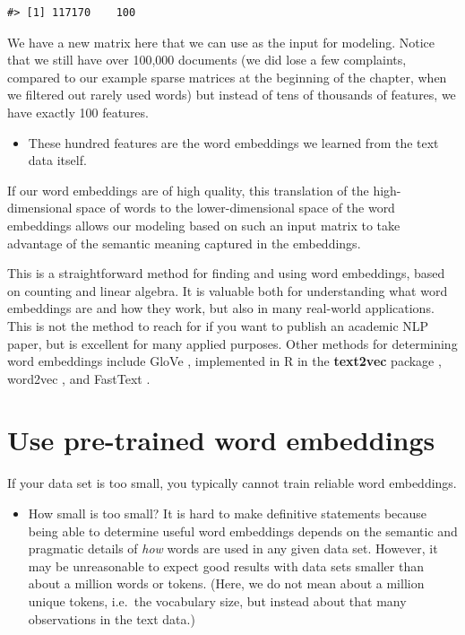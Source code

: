 \documentclass[
]{krantz}
\newenvironment{rmdblock}[1]
  {\begin{shaded*}
  \begin{itemize}[left = -1cm, labelsep = 1cm]
  \renewcommand{\labelitemi}{
    \raisebox{-.7\height}[0pt][0pt]{
      {\setkeys{Gin}{width=3em,keepaspectratio}\texttt{[image: images/\#1]}}
    }
  }
 
  \item
  }
  {
  \end{itemize}
  \end{shaded*}
  }
\newenvironment{rmdnote}
  {\begin{rmdblock}{note}}
  {\end{rmdblock}}
\newenvironment{rmdwarning}
  {\begin{rmdblock}{warning}}
  {\end{rmdblock}}
\begin{document}
\begin{verbatim}
#> [1] 117170    100
\end{verbatim}

We have a new matrix here that we can use as the input for modeling. Notice that we still have over 100,000 documents (we did lose a few complaints, compared to our example sparse matrices at the beginning of the chapter, when we filtered out rarely used words) but instead of tens of thousands of features, we have exactly 100 features.

\begin{rmdnote}
These hundred features are the word embeddings we learned from the text
data itself.
\end{rmdnote}

If our word embeddings are of high quality, this translation of the high-dimensional space of words to the lower-dimensional space of the word embeddings allows our modeling based on such an input matrix to take advantage of the semantic meaning captured in the embeddings.

This is a straightforward method for finding and using word embeddings, based on counting and linear algebra. It is valuable both for understanding what word embeddings are and how they work, but also in many real-world applications. This is not the method to reach for if you want to publish an academic NLP paper, but is excellent for many applied purposes. Other methods for determining word embeddings include GloVe \citep{Pennington2014}, implemented in R in the \textbf{text2vec} package \citep{Selivanov2018}, word2vec \citep{Mikolov2013}, and FastText \citep{Bojanowski2016}.

\hypertarget{glove}{%
\section{Use pre-trained word embeddings}\label{glove}}

If your data set is too small, you typically cannot train reliable word embeddings.

\begin{rmdwarning}
How small is too small? It is hard to make definitive statements because
being able to determine useful word embeddings depends on the semantic
and pragmatic details of \emph{how} words are used in any given data
set. However, it may be unreasonable to expect good results with data
sets smaller than about a million words or tokens. (Here, we do not mean
about a million unique tokens, i.e.~the vocabulary size, but instead
about that many observations in the text data.)
\end{rmdwarning}
\end{document}
